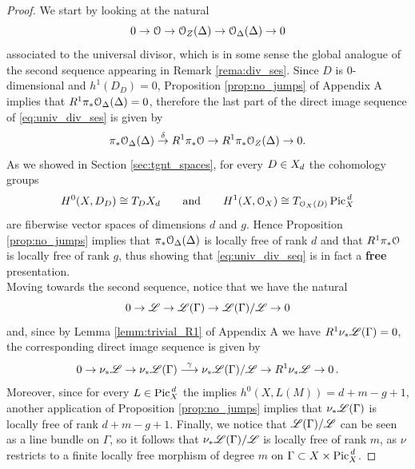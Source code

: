 		\begin{proof}
			We start by looking at the natural \ses
			\begin{equation}\label{eq:univ_div_ses}
				0 \to \mathcal{O} \to \mathcal{O}_Z(\Delta) \to \mathcal{O}_\Delta(\Delta) \to 0 
			\end{equation}
			associated to the universal divisor, which is in some sense the global analogue of the second sequence appearing in Remark \ref{rema:div_ses}. Since $D$ is $0$-dimensional and $h^1(D_D)= 0$, Proposition \ref{prop:no_jumps} of Appendix A implies that $R^1 \pi_* \mathcal{O}_{\Delta}(\Delta) = 0$, therefore the last part of the direct image sequence of \ref{eq:univ_div_ses} is given by
			$$
				\pi_* \mathcal{O}_{\Delta}(\Delta)\overset{\delta}\to R^1 \pi_* \mathcal{O} \to R^1 \pi_* \mathcal{O}_Z(\Delta) \to 0.
			$$
			As we showed in Section \ref{sec:tgnt_spaces}, for every $D\in X_d$ the cohomology groups
			$$ H^0(X, D_D) \cong T_D X_d \qquad \text{and} \qquad H^1(X, \mathcal{O}_X) \cong T_{\mathcal{O}_X(D)} \operatorname{Pic}^{\,d}_X $$
			are fiberwise vector spaces of dimensions $d$ and $g$. Hence Proposition \ref{prop:no_jumps} implies that $\pi_* \mathcal{O}_{\Delta}(\Delta)$ is locally free of rank $d$ and that $R^1 \pi_* \mathcal{O}$ is locally free of rank $g$, thus showing that \eqref{eq:univ_div_seq} is in fact a \textbf{free} presentation.
			\\
			Moving towards the second sequence, notice that we have the natural \ses 
			\begin{equation}\label{eq:univ_lb_ses}
				0 \to \mathscr{L} \to \mathscr{L}(\Gamma) \to \mathscr{L}(\Gamma)/\mathscr{L} \to 0 
			\end{equation}
			and, since by Lemma \ref{lemm:trivial_R1} of Appendix A we have $R^1 \nu_{*} \mathscr{L}(\Gamma) = 0$, the corresponding direct image sequence is given by
			\begin{equation}\label{eq:univ_lb_direct_image}
				0 \to \nu_{*}\mathscr{L} \to \nu_{*} \mathscr{L}(\Gamma)\overset{\gamma}{\longrightarrow} \nu_{*} \mathscr{L}(\Gamma) / \mathscr{L} \to R^1 \nu_{*} \mathscr{L} \to 0 \,.
			\end{equation}
			Moreover, since for every $L\in \operatorname{Pic}^{\,d}_X$ the \RR implies $h^0(X, L(M)) = d+m-g+1 $, another application of Proposition \ref{prop:no_jumps} implies that  $\nu_{*} \mathscr{L}(\Gamma)$ is locally free of rank $d+m-g+1$. 
			Finally, we notice that $\mathscr{L}(\Gamma) / \mathscr{L}$ can be seen as a line bundle on $\Gamma$, so it follows that $\nu_{*} \mathscr{L}(\Gamma) / \mathscr{L}$ is locally free of rank $m$, as $\nu$ restricts to a finite locally free morphism of degree $m$ on $\Gamma\subset X\times \operatorname{Pic}^{\,d}_X$.
		\end{proof}

